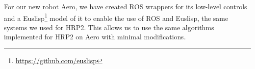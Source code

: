 \documentclass{standalone}
\begin{document}
For our new robot Aero, we have created ROS wrappers for its low-level
controls and a Euslisp\footnote{\url{https://github.com/euslisp}}
model of it to enable the use of ROS and Euslisp, the same systems we
used for HRP2. This allows us to use the same algorithms implemented
for HRP2 on Aero with minimal modifications. 
\end{document}
